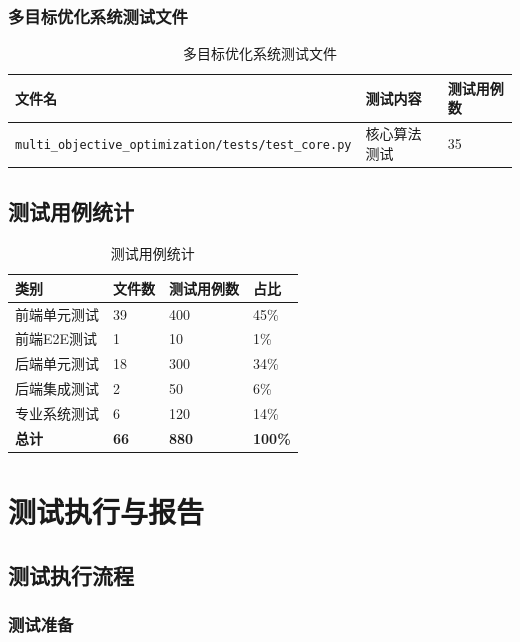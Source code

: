 \documentclass[12pt,a4paper,openany]{report}
\begin{document}
\subsection{多目标优化系统测试文件}

\begin{table}[h]
\centering
\caption{多目标优化系统测试文件}
\begin{tabular}{|l|l|l|}
\hline
\textbf{文件名} & \textbf{测试内容} & \textbf{测试用例数} \\
\hline
\texttt{multi\_objective\_optimization/tests/test\_core.py} & 核心算法测试 & 35 \\
\hline
\end{tabular}
\end{table}

\section{测试用例统计}

\begin{table}[h]
\centering
\caption{测试用例统计}
\begin{tabular}{|l|l|l|l|}
\hline
\textbf{类别} & \textbf{文件数} & \textbf{测试用例数} & \textbf{占比} \\
\hline
前端单元测试 & 39 & 400 & 45\% \\
前端E2E测试 & 1 & 10 & 1\% \\
后端单元测试 & 18 & 300 & 34\% \\
后端集成测试 & 2 & 50 & 6\% \\
专业系统测试 & 6 & 120 & 14\% \\
\hline
\textbf{总计} & \textbf{66} & \textbf{880} & \textbf{100\%} \\
\hline
\end{tabular}
\end{table}

\chapter{测试执行与报告}

\section{测试执行流程}

\subsection{测试准备}
\end{document}
